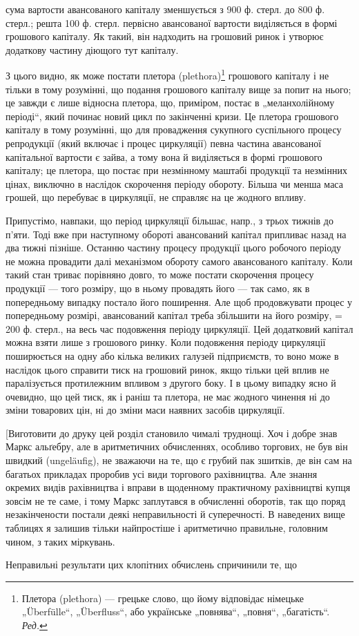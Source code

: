 \parcont{}  %
сума вартости авансованого капіталу зменшується з 900 ф. стерл. до
800 ф. стерл.; решта 100 ф. стерл. первісно авансованої вартости виділяється
в формі грошового капіталу. Як такий, він надходить на грошовий
ринок і утворює додаткову частину діющого тут капіталу.

З цього видно, як може постати плетора (plethora)\footnote*{
Плетора (plethora) — грецьке слово, що йому відповідає німецьке „Überfülle“,
„Überfluss“, або українське „повнява“, „повня“, „багатість“. \emph{Ред.}
} грошового капіталу
і не тільки в тому розумінні, що подання грошового капіталу вище
за попит на нього; це завжди є лише відносна плетора, що, приміром,
постає в „меланхолійному періоді“, який починає новий цикл по
закінченні кризи. Це плетора грошового капіталу в тому розумінні, що
для провадження сукупного суспільного процесу репродукції (який включає
і процес циркуляції) певна частина авансованої капітальної вартости
є зайва, а тому вона й виділяється в формі грошового капіталу; це плетора,
що постає при незмінному маштабі продукції та незмінних цінах,
виключно в наслідок скорочення періоду обороту. Більша чи менша маса
грошей, що перебуває в циркуляції, не справляє на це жодного впливу.

Припустімо, навпаки, що період циркуляції більшає, напр., з трьох
тижнів до п’яти. Тоді вже при наступному обороті авансований капітал
припливає назад на два тижні пізніше. Останню частину процесу продукції
цього робочого періоду не можна провадити далі механізмом обороту
самого авансованого капіталу. Коли такий стан триває порівняно довго,
то може постати скорочення процесу продукції — того розміру, що в
ньому провадять його — так само, як в попередньому випадку постало
його поширення. Але щоб продовжувати процес у попередньому розмірі,
авансований капітал треба збільшити на  його розміру, = 200 ф.
стерл., на весь час подовження періоду циркуляції. Цей додатковий капітал
можна взяти лише з грошового ринку. Коли подовження періоду
циркуляції поширюється на одну або кілька великих галузей підприємств,
то воно може в наслідок цього справити тиск на грошовий ринок, якщо
тільки цей вплив не паралізується протилежним впливом з другого боку.
І в цьому випадку ясно й очевидно, що цей тиск, як і раніш та плетора,
не має жодного чинення ні до зміни товарових цін, ні до зміни маси
наявних засобів циркуляції.

[Виготовити до друку цей розділ становило чималі труднощі. Хоч і
добре знав Маркс альґебру, але в аритметичних обчисленнях, особливо
торгових, не був він швидкий (ungeläufig), не зважаючи на те, що є грубий
пак зшитків, де він сам на багатьох прикладах проробив усі види торгового
рахівництва. Але знання окремих видів рахівництва і вправи в
щоденному практичному рахівництві купця зовсім не те саме, і тому
Маркс заплутався в обчисленні оборотів, так що поряд незакінчености
постали деякі неправильності й суперечності. В наведених вище таблицях
я залишив тільки найпростіше і аритметично правильне, головним чином,
з таких міркувань.

Неправильні результати цих клопітних обчислень спричинили те, що
\parbreak{}  %
